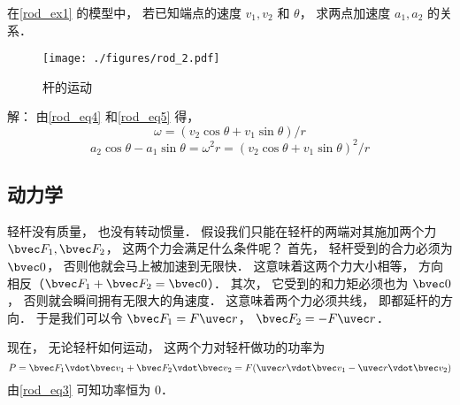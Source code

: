 \begin{example}{}
在\autoref{rod_ex1} 的模型中， 若已知端点的速度 $v_1, v_2$ 和 $\theta$， 求两点加速度 $a_1, a_2$ 的关系．
\begin{figure}[ht]
\centering
\texttt{[image: ./figures/rod\_2.pdf]}
\caption{杆的运动} \label{rod_fig2}
\end{figure}

解： 由\autoref{rod_eq4} 和\autoref{rod_eq5} 得，
\begin{equation}
\omega = (v_2 \cos\theta + v_1 \sin\theta)/r
\end{equation}
\begin{equation}
a_2 \cos\theta - a_1 \sin\theta = \omega^2 r = (v_2 \cos\theta + v_1 \sin\theta)^2/r
\end{equation}
\end{example}

\subsection{动力学}
轻杆没有质量， 也没有转动惯量． 假设我们只能在轻杆的两端对其施加两个力 $\bvec F_1, \bvec F_2$， 这两个力会满足什么条件呢？ 首先， 轻杆受到的合力必须为 $\bvec 0$， 否则他就会马上被加速到无限快． 这意味着这两个力大小相等， 方向相反（$\bvec F_1 + \bvec F_2 = \bvec 0$）． 其次， 它受到的和力矩必须也为 $\bvec 0$， 否则就会瞬间拥有无限大的角速度． 这意味着两个力必须共线， 即都延杆的方向． 于是我们可以令 $\bvec F_1 = F \uvec r$， $\bvec F_2 = -F \uvec r$．

现在， 无论轻杆如何运动， 这两个力对轻杆做功的功率为
\begin{equation}
P = \bvec F_1 \vdot \bvec v_1 + \bvec F_2 \vdot \bvec v_2 = F (\uvec r \vdot \bvec v_1 - \uvec r \vdot \bvec v_2)
\end{equation}
由\autoref{rod_eq3} 可知功率恒为 0．
